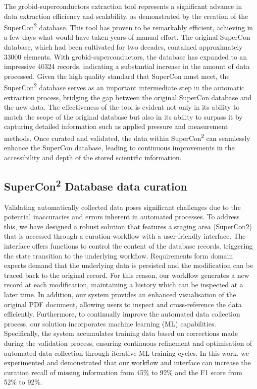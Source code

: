 The grobid-superconductors extraction tool represents a significant advance in data extraction efficiency and scalability, as demonstrated by the creation of the SuperCon\textsuperscript{2} database. 
This tool has proven to be remarkably efficient, achieving in a few days what would have taken years of manual effort. 
The original SuperCon database, which had been cultivated for two decades, contained approximately 33000 elements. 
With grobid-superconductors, the database has expanded to an impressive 40324 records, indicating a substantial increase in the amount of data processed. 
Given the high quality standard that SuperCon must meet, the SuperCon\textsuperscript{2} database serves as an important intermediate step in the automatic extraction process, bridging the gap between the original SuperCon database and the new data. 
The effectiveness of the tool is evident not only in its ability to match the scope of the original database but also in its ability to surpass it by capturing detailed information such as applied pressure and measurement methods. Once curated and validated, the data within SuperCon\textsuperscript{2} can seamlessly enhance the SuperCon database, leading to continuous improvements in the accessibility and depth of the stored scientific information.

\subsection{SuperCon\texorpdfstring{\textsuperscript{2}}{2} Database data curation}

Validating automatically collected data poses significant challenges due to the potential inaccuracies and errors inherent in automated processes. 
To address this, we have designed a robust solution that features a staging area (SuperCon2) that is accessed through a curation workflow with a user-friendly interface. 
The interface offers functions to control the content of the database records, triggering the state transition to the underlying workflow. 
Requirements form domain experts demand that the underlying data is persisted and the modification can be traced back to the original record. For this reason, our workflow generates a new record at each modification, maintaining a history which can be inspected at a later time. 
In addition, our system provides an enhanced visualisation of the original PDF document, allowing users to inspect and cross-reference the data efficiently. 
Furthermore, to continually improve the automated data collection process, our solution incorporates machine learning (ML) capabilities. 
Specifically, the system accumulates training data based on corrections made during the validation process, ensuring continuous refinement and optimisation of automated data collection through iterative ML training cycles.
In this work, we experimented and demonstrated that our workflow and interface can increase the curation recall of missing information from 45\% to 92\% and the F1 score from 52\% to 92\%. 
